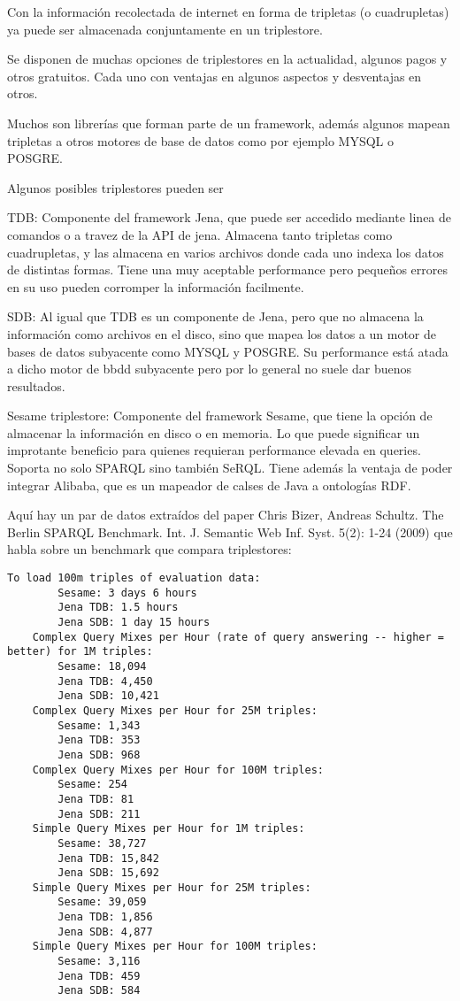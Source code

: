 Con la información recolectada de internet en forma de tripletas (o cuadrupletas) ya puede ser almacenada conjuntamente en un triplestore. 

Se disponen de muchas opciones de triplestores en la actualidad, algunos pagos y otros gratuitos. Cada uno con ventajas en algunos aspectos y desventajas en otros.

Muchos son librerías que forman parte de un framework, además algunos mapean tripletas a otros motores de base de datos como por ejemplo MYSQL o POSGRE.

Algunos posibles triplestores pueden ser

TDB: Componente del framework Jena, que puede ser accedido mediante linea de comandos o a travez de la API de jena. Almacena tanto tripletas como cuadrupletas, y las almacena en varios archivos donde cada uno indexa los datos de distintas formas. Tiene una muy aceptable performance pero pequeños errores en su uso pueden corromper la información facilmente.

SDB: Al igual que TDB es un componente de Jena, pero que no almacena la información como archivos en el disco, sino que mapea los datos a un motor de bases de datos subyacente como MYSQL y POSGRE. Su performance está atada a dicho motor de bbdd subyacente pero por lo general no suele dar buenos resultados. 

Sesame triplestore: Componente del framework Sesame, que tiene la opción de almacenar la información en disco o en memoria. Lo que puede significar un improtante beneficio para quienes requieran performance elevada en queries. Soporta no solo SPARQL sino también SeRQL. Tiene además la ventaja de poder integrar Alibaba, que es un mapeador de calses de Java a ontologías RDF.

Aquí hay un par de datos extraídos del paper Chris Bizer, Andreas Schultz. The Berlin SPARQL Benchmark. Int. J. Semantic Web Inf. Syst. 5(2): 1-24 (2009) que habla sobre un benchmark que compara triplestores:

\begin{lstlisting}[frame=single]  
    To load 100m triples of evaluation data:
        Sesame: 3 days 6 hours
        Jena TDB: 1.5 hours
        Jena SDB: 1 day 15 hours
    Complex Query Mixes per Hour (rate of query answering -- higher = better) for 1M triples:
        Sesame: 18,094
        Jena TDB: 4,450
        Jena SDB: 10,421
    Complex Query Mixes per Hour for 25M triples:
        Sesame: 1,343
        Jena TDB: 353
        Jena SDB: 968
    Complex Query Mixes per Hour for 100M triples:
        Sesame: 254
        Jena TDB: 81
        Jena SDB: 211
    Simple Query Mixes per Hour for 1M triples:
        Sesame: 38,727
        Jena TDB: 15,842
        Jena SDB: 15,692
    Simple Query Mixes per Hour for 25M triples:
        Sesame: 39,059
        Jena TDB: 1,856
        Jena SDB: 4,877
    Simple Query Mixes per Hour for 100M triples:
        Sesame: 3,116
        Jena TDB: 459
        Jena SDB: 584
\end{lstlisting}
        
